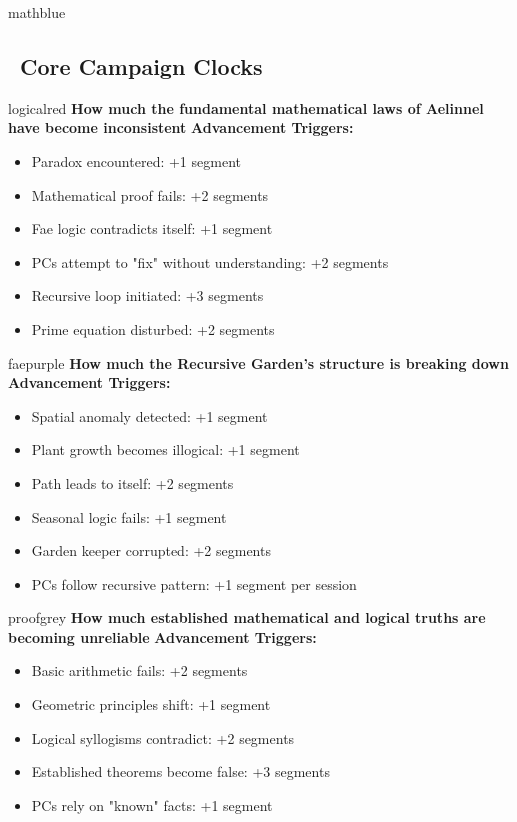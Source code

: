 \documentclass[11pt]{article}
\begin{document}
\newpage

\begin{campaignsection}{mathblue}
\subsection*{\faClock\ Core Campaign Clocks}

\begin{clockbox}{logicalred}
\textbf{How much the fundamental mathematical laws of Aelinnel have become inconsistent}
\textbf{Advancement Triggers:}
\begin{itemize}
    \item Paradox encountered: +1 segment
    \item Mathematical proof fails: +2 segments
    \item Fae logic contradicts itself: +1 segment
    \item PCs attempt to "fix" without understanding: +2 segments
    \item Recursive loop initiated: +3 segments
    \item Prime equation disturbed: +2 segments
\end{itemize}
\end{clockbox}

\begin{clockbox}{faepurple}
\textbf{How much the Recursive Garden's structure is breaking down}
\textbf{Advancement Triggers:}
\begin{itemize}
    \item Spatial anomaly detected: +1 segment
    \item Plant growth becomes illogical: +1 segment
    \item Path leads to itself: +2 segments
    \item Seasonal logic fails: +1 segment
    \item Garden keeper corrupted: +2 segments
    \item PCs follow recursive pattern: +1 segment per session
\end{itemize}
\end{clockbox}

\begin{clockbox}{proofgrey}
\textbf{How much established mathematical and logical truths are becoming unreliable}
\textbf{Advancement Triggers:}
\begin{itemize}
    \item Basic arithmetic fails: +2 segments
    \item Geometric principles shift: +1 segment
    \item Logical syllogisms contradict: +2 segments
    \item Established theorems become false: +3 segments
    \item PCs rely on "known" facts: +1 segment
\end{itemize}
\end{clockbox}


\end{campaignsection}
\end{document}
